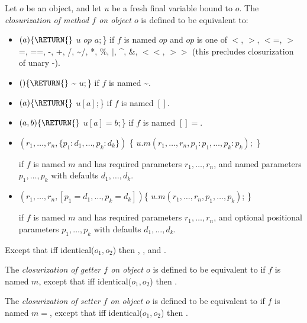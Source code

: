 \documentclass{article}
\newcommand{\code}[1]{{\sf #1}}
\begin{document}
\LMHash{}
Let $o$ be an object, and let $u$ be a fresh final variable bound to $o$.
The {\em closurization of method $f$ on object $o$} is defined to be equivalent to:
\begin{itemize}
\item $(a) \{\RETURN{}$ $u$ $op$ $a;$\} if $f$ is named $op$ and $op$ is one of  \code{$<$, $>$, $<$=, $>$=, ==,  -, +, /, \~{}/, *, \%, $|$, \^{}, \&, $<<$, $>>$} (this precludes closurization of unary -).
\item $() \{\RETURN{}$ \~{} $u;$\} if $f$ is named \~{}.
\item $(a) \{\RETURN{}$ $u[a];$\} if $f$ is named $[]$.
\item $(a, b) \{\RETURN{}$ $u[a] = b;$\} if $f$ is named $[]=$.
\item  
\begin{dartCode}
$(r_1, \ldots, r_n, \{p_1 : d_1, \ldots , p_k : d_k\})$ \{
  \RETURN{} $ u.m(r_1, \ldots, r_n, p_1: p_1, \ldots, p_k: p_k);$
\} 
\end{dartCode}
if $f$ is named $m$ and has required parameters $r_1, \ldots, r_n$, and named parameters $p_1, \ldots, p_k$ with defaults $d_1, \ldots, d_k$.
\item 
\begin{dartCode}
$(r_1, \ldots, r_n, [p_1 = d_1, \ldots , p_k = d_k])$\{
  \RETURN{} $u.m(r_1, \ldots, r_n, p_1, \ldots, p_k)$;
\}
\end{dartCode}

if $f$ is named $m$ and has required parameters $r_1, \ldots, r_n$, and optional positional parameters $p_1, \ldots, p_k$ with defaults $d_1, \ldots, d_k$.
\end{itemize}

\LMHash{}
Except that iff  \code{identical($o_1, o_2$)}  then  ,  ,  and  .

\LMHash{}
The {\em closurization of getter $f$ on object $o$} is defined to be equivalent to  if $f$ is named $m$, except that iff  \code{identical($o_1, o_2$)} then  .

\LMHash{}
The {\em closurization of setter $f$ on object $o$} is defined to be equivalent to  if $f$ is named $m=$, except that iff  \code{identical($o_1, o_2$)} then .
\end{document}

